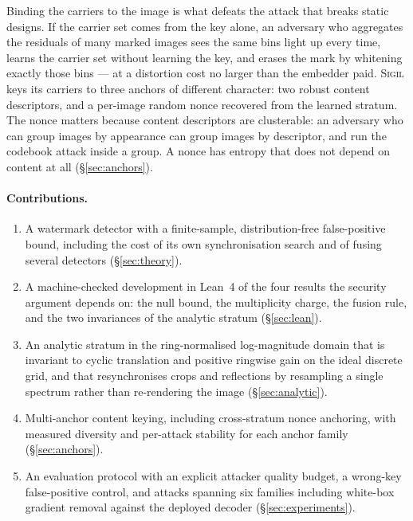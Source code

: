 \documentclass[10pt,twocolumn]{article}
\theoremstyle{definition}
\theoremstyle{remark}
\newcommand{\sigil}{\textsc{Sigil}}
\begin{document}
Binding the carriers to the image is what defeats the attack that breaks static
designs. If the carrier set comes from the key alone, an adversary who
aggregates the residuals of many marked images sees the same bins light up every
time, learns the carrier set without learning the key, and erases the mark by
whitening exactly those bins --- at a distortion cost no larger than the
embedder paid. \sigil{} keys its carriers to three anchors of different
character: two robust content descriptors, and a per-image random nonce recovered
from the learned stratum. The nonce matters because content descriptors are
clusterable: an adversary who can group images by appearance can group images by
descriptor, and run the codebook attack inside a group. A nonce has entropy that
does not depend on content at all (\S\ref{sec:anchors}).

\paragraph{Contributions.}
\begin{enumerate}[leftmargin=1.2em,itemsep=1pt,topsep=2pt]
\item A watermark detector with a finite-sample, distribution-free false-positive bound,
      including the cost of its own synchronisation search
      and of fusing several detectors (\S\ref{sec:theory}).
\item A machine-checked development in Lean~4 of the four results the security
      argument depends on: the null bound, the multiplicity charge, the fusion
      rule, and the two invariances of the analytic stratum
      (\S\ref{sec:lean}).
\item An analytic stratum in the ring-normalised log-magnitude domain that is
      invariant to cyclic translation and positive ringwise gain on the ideal
      discrete grid, and that resynchronises crops and reflections by
      resampling a single spectrum rather than re-rendering the image
      (\S\ref{sec:analytic}).
\item Multi-anchor content keying, including cross-stratum nonce anchoring, with
      measured diversity and per-attack stability for each anchor family
      (\S\ref{sec:anchors}).
\item An evaluation protocol with an explicit attacker quality budget, a
      wrong-key false-positive control, and attacks spanning six
      families including white-box gradient removal against the deployed decoder
      (\S\ref{sec:experiments}).
\end{enumerate}
\end{document}

